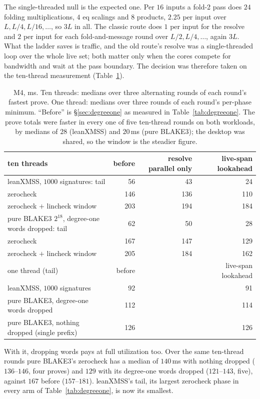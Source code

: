 \documentclass[11pt]{article}
\begin{document}
The single-threaded null is the expected one. Per $16$ inputs a fold-2
pass does $24$ folding multiplications, $4$ eq scalings and $8$ products,
$2.25$ per input over $L, L/4, L/16,\dots$, so $3L$ in all. The classic
route does $1$ per input for the resolve and $2$ per input for each
fold-and-message round over $L/2, L/4,\dots$, again $3L$. What the ladder
saves is traffic, and the old route's resolve was a single-threaded loop
over the whole live set; both matter only when the cores compete for
bandwidth and wait at the pass boundary. The decision was therefore taken
on the ten-thread measurement (Table~\ref{tab:livelookahead}).

\begin{table}[h]
\centering
\small
\begin{tabular}{@{}lrrr@{}}
\toprule
ten threads & before & resolve parallel only & live-span lookahead\\
\midrule
leanXMSS, $1000$ signatures: tail & 56 & 43 & 24\\
\quad zerocheck & 146 & 136 & 110\\
\quad zerocheck $+$ lincheck window & 203 & 194 & 184\\
pure BLAKE3 $2^{18}$, degree-one words dropped: tail & 62 & 50 & 28\\
\quad zerocheck & 167 & 147 & 129\\
\quad zerocheck $+$ lincheck window & 205 & 184 & 162\\
\midrule
one thread (tail) & before & & live-span lookahead\\
\midrule
leanXMSS, $1000$ signatures & 92 & & 91\\
pure BLAKE3, degree-one words dropped & 112 & & 114\\
pure BLAKE3, nothing dropped (single prefix) & 126 & & 126\\
\bottomrule
\end{tabular}
\caption{M4, ms. Ten threads: medians over three alternating rounds of each
round's fastest prove. One thread: medians over three rounds of each
round's per-phase minimum. ``Before'' is \S\ref{sec:degreeone} as
measured in Table~\ref{tab:degreeone}. The prove totals were faster in
every one of five ten-thread rounds on both workloads, by medians of
$28$ (leanXMSS) and $20\,$ms (pure BLAKE3); the desktop was shared, so the
window is the steadier figure.}\label{tab:livelookahead}
\end{table}

With it, dropping words pays at full utilization too. Over the same
ten-thread rounds pure BLAKE3's zerocheck has a median of $140\,$ms with
nothing dropped ($136$--$146$, four proves) and $129$ with its degree-one
words dropped ($121$--$143$, five), against $167$ before ($157$--$181$). leanXMSS's tail, its largest zerocheck phase in every arm of
Table~\ref{tab:degreeone}, is now its smallest.
\end{document}
